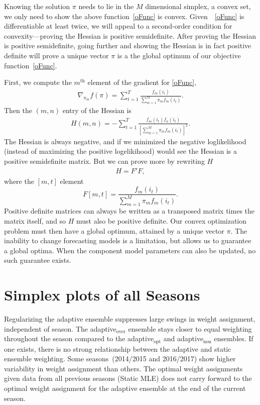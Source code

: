 \documentclass[12pt]{article}
\def\l{\left}
\def\r{\right}
\newcommand{\f}{\frac}
\begin{document}
Knowing the solution $\pi$ needs to lie in the $M$ dimensional simplex, a convex set, we only need to show the above function~\eqref{oFunc} is convex.
Given~~\eqref{oFunc} is differentiable at least twice, we will appeal to a second-order condition for convexity---proving the Hessian is positive semidefinite.
After proving the Hessian is positive semidefinite, going further and showing the Hessian is in fact positive definite will prove a unique vector $\pi$ is a the global optimum of our objective function~\eqref{oFunc}.

First, we compute the $m^{\text{th}}$ element of the gradient for \eqref{oFunc},
\begin{align*}
  \nabla_{\pi_m} f(\pi) = \sum_{t=1}^{T} \f{f_{m}(i_{i})}{\sum_{m=1}^{M} \pi_mf_{m}(i_{t}) }.
\end{align*}
Then the $(m,n)$ entry of the Hessian is
\begin{align*}
  H(m,n) = - \sum_{t=1}^{T} \f{ f_{m}(i_{t}) f_{n}(i_{t})}{ \l[\sum_{m=1}^{M} \pi_mf_{m}(i_{t})  \r]^{2} }.
\end{align*}
The Hessian is always negative, and if we minimized the negative loglikelihood (instead of maximizing the positive logelikihood) would see the Hessian is a positive semidefinite matrix.
But we can prove more by rewriting $H$
\begin{align*}
 H = F'F,
\end{align*}
where the $[m,t]$ element
\begin{equation*}
  F[m,t] = \f{f_{m}(i_{t})}{\sum_{m=1}^{M}\pi_mf_{m}(i_{t})}.
\end{equation*}
Positive definite matrices can always be written as a transposed matrix times the matrix itself, and so $H$ must also be positive definite.
Our convex optimization problem must then have a global optimum, attained by a unique vector $\pi$.
The inability to change forecasting models is a limitation, but allows us to guarantee a global optima.
When the component model parameters can also be updated, no such guarantee exists.


\section{Simplex plots of all Seasons}
\label{simplexplot}

Regularizing the adaptive ensemble suppresses large swings in weight assignment, independent of season.
The adaptive$_{\text{over}}$ ensemble stays closer to equal weighting throughout the season compared to the adaptive$_{\text{opt}}$ and adaptive$_{\text{non}}$ ensembles.
If one exists, there is no strong relationship between the adaptive and static ensemble weighting.
Some seasons~(2014/2015 and 2016/2017) show higher variability in weight assignment than others.
The optimal weight assignments given data from all previous seasons (Static MLE) does not carry forward to the optimal weight assignment for the adaptive ensemble at the end of the current season.  
\end{document}
